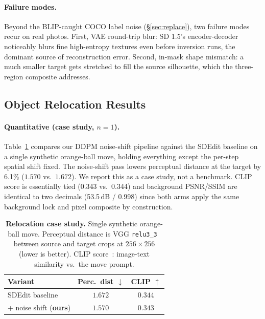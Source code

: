 \documentclass[10pt,twocolumn,letterpaper]{article}
\begin{document}
\paragraph{Failure modes.}
\label{sec:exp:fails}
Beyond the BLIP-caught COCO label noise (\S\ref{sec:replace}), two failure modes recur on real photos. First, VAE round-trip blur: SD 1.5's encoder-decoder noticeably blurs fine high-entropy textures even before inversion runs, the dominant source of reconstruction error. Second, in-mask shape mismatch: a much smaller target gets stretched to fill the source silhouette, which the three-region composite addresses.

\subsection{Object Relocation Results}
\label{sec:exp:relocate}

\paragraph{Quantitative (case study, $n{=}1$).}
Table~\ref{tab:relocate} compares our DDPM noise-shift pipeline against the SDEdit baseline on a single synthetic orange-ball move, holding everything except the per-step spatial shift fixed. The noise-shift pass lowers perceptual distance at the target by 6.1\% ($1.570$ vs.\ $1.672$). We report this as a case study, not a benchmark. CLIP score is essentially tied (0.343 vs.\ 0.344) and background PSNR/SSIM are identical to two decimals (53.5\,dB / 0.998) since both arms apply the same background lock and pixel composite by construction.

\begin{table}[t]
    \centering
    \small
    \begin{tabular}{lcc}
        \toprule
        \textbf{Variant} & \textbf{Perc.\ dist $\downarrow$} & \textbf{CLIP $\uparrow$} \\
        \midrule
        SDEdit baseline & $1.672$ & $0.344$ \\
        + noise shift (\textbf{ours}) & $\mathbf{1.570}$ & $0.343$ \\
        \bottomrule
    \end{tabular}
    \caption{\textbf{Relocation case study.} Single synthetic orange-ball move. Perceptual distance is VGG \texttt{relu3\_3}~\cite{zhang2018lpips} between source and target crops at $256{\times}256$ (lower is better). CLIP score~\cite{radford2021clip}: image-text similarity vs.\ the move prompt.}
    \label{tab:relocate}
\end{table}
\end{document}
